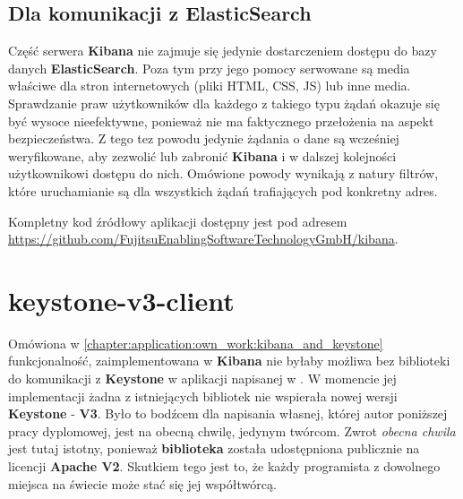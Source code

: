     \subsection{Dla komunikacji z ElasticSearch}
    Część serwera \textbf{Kibana} nie zajmuje się jedynie dostarczeniem dostępu do bazy danych
    \textbf{ElasticSearch}. Poza tym przy jego pomocy serwowane są media właściwe dla stron internetowych
    (pliki HTML, CSS, JS) lub inne media. Sprawdzanie praw użytkowników dla
    każdego z takiego typu żądań okazuje się być wysoce nieefektywne, ponieważ nie ma faktycznego
    przełożenia na aspekt bezpieczeństwa. Z tego tez powodu jedynie żądania o dane są wcześniej 
    weryfikowane, aby zezwolić lub zabronić \textbf{Kibana} i w dalszej kolejności użytkownikowi dostępu do nich. Omówione powody wynikają z natury filtrów, które uruchamianie są dla 
    wszystkich żądań trafiających pod konkretny adres.

Kompletny kod źródłowy aplikacji dostępny jest pod adresem \url{https://github.com/FujitsuEnablingSoftwareTechnologyGmbH/kibana}.

\section{keystone-v3-client}
Omówiona w \ref{chapter:application:own_work:kibana_and_keystone} funkcjonalność, zaimplementowana w \textbf{Kibana} nie 
byłaby możliwa bez biblioteki do komunikacji z \textbf{Keystone} w aplikacji napisanej w .
W momencie jej implementacji żadna z istniejących bibliotek nie wspierała nowej wersji \textbf{Keystone} - \textbf{V3}. 
Było to bodźcem dla napisania własnej, której autor poniższej pracy dyplomowej, jest na obecną chwilę, jedynym twórcom. Zwrot \textit{obecna chwila}
jest tutaj istotny, ponieważ \textbf{biblioteka} została udostępniona publicznie na licencji \textbf{Apache V2}. Skutkiem tego jest to, że
każdy programista z dowolnego miejsca na świecie może stać się jej współtwórcą. 

